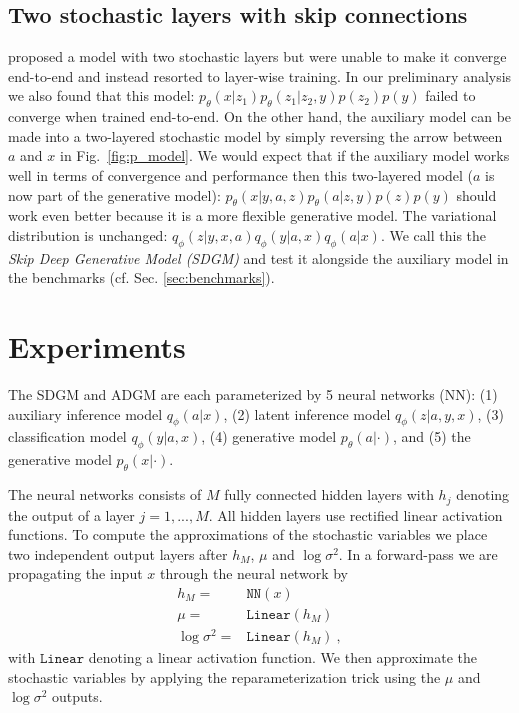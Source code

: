 \documentclass{article}
\begin{document}
\subsection{Two stochastic layers with skip connections} \label{sec:sdgm}
\citet{Kingma14} proposed a model with two stochastic layers but were unable to make it converge end-to-end and instead resorted to layer-wise training. In our preliminary analysis we also found that this model: $p_\theta(x|z_1)p_\theta(z_1|z_2,y)p(z_2)p(y)$ failed to converge when trained end-to-end. On the other hand, the auxiliary model can be made into a two-layered stochastic model by simply reversing the arrow between $a$ and $x$ in Fig.~\ref{fig:p_model}. We would expect that if the auxiliary model works well in terms of convergence and performance then this two-layered model ($a$ is now part of the generative model): $p_\theta(x|y,a,z)p_\theta(a|z,y)p(z)p(y)$ should work even better because it is a more flexible generative model. The variational distribution is unchanged: $q_\phi(z|y,x,a)q_\phi(y|a,x)q_\phi(a|x)$. We call this the \emph{Skip Deep Generative Model (SDGM)} and test it alongside the auxiliary model in the benchmarks (cf. Sec. \ref{sec:benchmarks}).

\section{Experiments}\label{sec:experimenta_details}
The SDGM and ADGM are each parameterized by 5 neural networks (NN): (1) auxiliary inference model $q_\phi(a|x)$, (2) latent inference model $q_\phi(z|a,y,x)$, (3) classification model $q_\phi(y|a,x)$, (4) generative model $p_\theta(a|\cdot)$, and (5) the generative model $p_\theta(x|\cdot)$.

The neural networks consists of $M$ fully connected hidden layers with $h_j$ denoting the output of a layer $j=1,...,M$. All hidden layers use rectified linear activation functions. To compute the approximations of the stochastic variables we place two independent output layers after $h_M$, $\mu$ and $\log \sigma^2$. In a forward-pass we are propagating the input $x$ through the neural network by
\begin{align}
h_M =& \mathtt{NN}(x)\\
\mu =& \mathtt{Linear}(h_M)\\
\log \sigma^2 =& \mathtt{Linear}(h_M) \ ,
\end{align}
with $\mathtt{Linear}$ denoting a linear activation function. We then approximate the stochastic variables by applying the reparameterization trick using the $\mu$ and $\log \sigma^2$ outputs.
\end{document}
